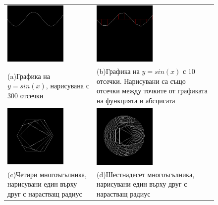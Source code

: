 \documentclass[12pt,a4paper]{article}
\begin{document}
{\begin{figure}
  \begin{center}
  \begin{tabular}{|p{5.2cm}p{5.2cm}|}
   \hline
   \vspace{10pt}
   \includegraphics[width=3cm]{images/graph_sine} &
   \vspace{10pt}
   \includegraphics[width=3cm]{images/graph_sine_coarse}\\
   (a)Графика на $y=sin(x)$, нарисувана с 300 отсечки&
   (b)Графика на $y=sin(x)$ с 10 отсечки. Нарисувани са също отсечки между точките от графиката на функцията и абсцисата\\%
   \vspace{10pt}
   \includegraphics[width=3cm]{images/graph_4_polygons}  &
   \vspace{10pt}
   \includegraphics[width=3cm]{images/graph_16_polygons}  \\
   (c)Четири многоъгълника, нарисувани един върху друг с нарастващ радиус
   \vspace{10pt}&
   (d)Шестнадесет многоъгълника, нарисувани един върху друг с нарастващ радиус
   \vspace{10pt}  \\%

\end{tabular}
\end{center}
\end{figure}}
\end{document}
